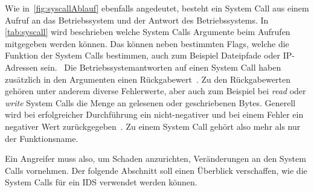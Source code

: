         Wie in~\autoref{fig:syscallAblauf} ebenfalls angedeutet, besteht ein System Call aus einem Aufruf an das Betriebssystem und der Antwort des Betriebssystems.
        In \autoref{tab:syscall} wird beschrieben welche System Calls Argumente beim Aufrufen mitgegeben werden können.        
        Das können neben bestimmten Flags, welche die Funktion der System Calls bestimmen, auch zum Beispiel Dateipfade oder IP-Adressen sein.~\cite{SYSCALL_MANPAGE}
        Die Betriebssystemantworten auf einen System Call haben zusätzlich in den Argumenten einen Rückgabewert~.
        Zu den Rückgabewerten gehören unter anderem diverse Fehlerwerte, aber auch zum Beispiel bei \textit{read} oder \textit{write} System Calls die Menge an gelesenen oder geschriebenen Bytes.
        Generell wird bei erfolgreicher Durchführung ein nicht-negativer und bei einem Fehler ein negativer Wert zurückgegeben~\cite{SYSCALLBOOKMOONA2009}.
        Zu einem System Call gehört also mehr als nur der Funktionsname.


        Ein Angreifer muss also, um Schaden anzurichten, Veränderungen an den System Calls vornehmen.%
        Der folgende Abschnitt soll einen Überblick verschaffen, wie die System Calls für ein \ac{IDS} verwendet werden können.

